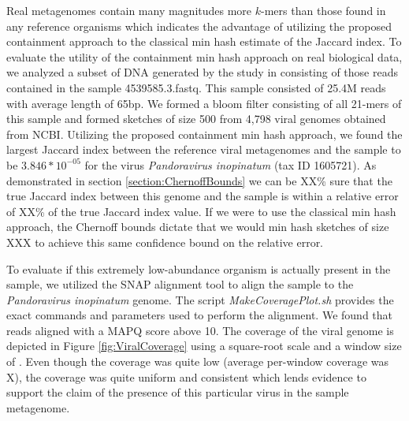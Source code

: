 \documentclass[11pt]{amsart}
\theoremstyle{remark}
\numberwithin{equation}{section}
\begin{document}
Real metagenomes contain many magnitudes more $k$-mers than those found in any reference organisms \cite{} which indicates the advantage of utilizing the proposed containment approach to the classical min hash estimate of the Jaccard index. To evaluate the utility of the containment min hash approach on real biological data, we analyzed a subset of DNA generated by the study in \cite{howe2014tackling} consisting of those reads contained in the sample 4539585.3.fastq. This sample consisted of 25.4M reads with average length of 65bp. We formed a bloom filter consisting of all 21-mers of this sample and formed sketches of size 500 from 4,798 viral genomes obtained from NCBI. Utilizing the proposed containment min hash approach, we found the largest Jaccard index between the reference viral metagenomes and the sample to be $3.846*10^{-05}$ for the virus 
\textit{Pandoravirus inopinatum} (tax ID 1605721). As demonstrated in section \ref{section:ChernoffBounds} we can be XX\% sure that the true Jaccard index between this genome and the sample is within a relative error of XX\% of the true Jaccard index value.  If we were to use the classical min hash approach, the Chernoff bounds dictate that we would min hash sketches of size XXX to achieve this same confidence bound on the relative error.

To evaluate if this extremely low-abundance organism is actually present in the sample, we utilized the SNAP alignment tool \cite{zaharia2011faster} to align the sample to the \textit{Pandoravirus inopinatum} genome. The script \textit{MakeCoveragePlot.sh} provides the exact commands and parameters used to perform the alignment. We found that reads aligned with a MAPQ score above 10. The coverage of the viral genome is depicted in Figure \ref{fig:ViralCoverage} using a square-root scale and a window size of \protect \unskip. Even though the coverage was quite low (average per-window coverage was \unskip X), the coverage was quite uniform and consistent which lends evidence to support the claim of the presence of this particular virus in the sample metagenome.
\end{document}
